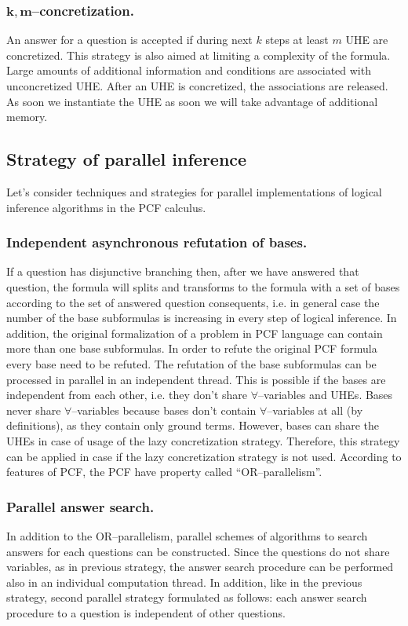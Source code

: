 \documentclass[runningheads,a4paper]{llncs}
\begin{document}
\subsubsection{$\boldsymbol{k,m}$--concretization.}
An answer for a question is accepted if during next $k$ steps at least $m$ UHE are concretized. This strategy is also aimed at limiting a complexity of the formula. Large amounts of additional information and conditions are associated with unconcretized UHE. After an UHE is concretized, the associations are released. As soon we instantiate the UHE as soon we will take advantage of additional memory.

\subsection{Strategy of parallel inference}

Let's consider techniques and strategies for parallel implementations of logical inference algorithms in the PCF calculus.

\subsubsection{Independent asynchronous refutation of bases.}
If a question has disjunctive branching then, after we have answered that question, the formula will splits and transforms to the formula with a set of bases according to the set of answered question consequents, i.e. in general case the number of the base subformulas is increasing in every step of logical inference. In addition, the original formalization of a problem in PCF language can contain more than one base subformulas. In order to refute the original PCF formula every base need to be refuted. The refutation of the base subformulas can be processed in parallel in an independent thread. This is possible if the bases are independent from each other, i.e. they don't share $\forall$--variables and UHEs. Bases never share $\forall$--variables because bases don't contain $\forall$--variables at all (by definitions), as they contain only ground terms. However, bases can share the UHEs in case of usage of the lazy concretization strategy. Therefore, this strategy can be applied in case if the lazy concretization strategy is not used. According to features of PCF, the PCF have property called ``OR--parallelism''.

\subsubsection{Parallel answer search.}
In addition to the OR--parallelism, parallel schemes of algorithms to search answers for each questions can be constructed. Since the questions do not share variables, as in previous strategy, the answer search procedure can be performed also in an individual computation thread. In addition, like in the previous strategy, second parallel strategy formulated as follows: each answer search procedure to a question is independent of other questions.
\end{document}
